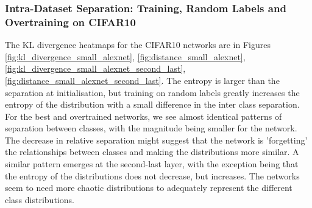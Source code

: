 \documentclass{article}
\begin{document}
            
            \subsubsection{Intra-Dataset Separation: Training, Random Labels and Overtraining on CIFAR10}
                The KL divergence heatmaps for the CIFAR10 networks are in Figures \ref{fig:kl_divergence_small_alexnet}, \ref{fig:distance_small_alexnet}, \ref{fig:kl_divergence_small_alexnet_second_last}, \ref{fig:distance_small_alexnet_second_last}. The entropy is larger than the separation at initialisation, but training on random labels greatly increases the entropy of the distribution with a small difference in the inter class separation. For the best and overtrained networks, we see almost identical patterns of separation between classes, with the magnitude being smaller for the network. The decrease in relative separation might suggest that the network is 'forgetting' the relationships between classes and making the distributions more similar. A similar pattern emerges at the second-last layer, with the exception being that the entropy of the distributions does not decrease, but increases. The networks seem to need more chaotic distributions to adequately represent the different class distributions.
                
\end{document}
